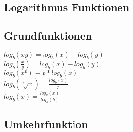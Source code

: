 \documentclass{article}
\begin{document}
	\begin{multicols}{3}
		\section{Logarithmus Funktionen}
		\subsection{Grundfunktionen}
		\(log_b(xy) = log_b(x) + log_b(y)\)\\
		\(log_b(\frac{x}{y}) = log_b(x) - log_b(y)\)\\
		\(log_b(x^p) = p * log_b(x) \)\\
		\(log_b(\sqrt[p]{x}) = \frac{log_b(x)}{p} \)\\
		\(log_b(x) = \frac{log_k(x)}{log_k(b)} \)
	
		\subsection{Umkehrfunktion}
	\end{multicols}
	
	
\end{document}
